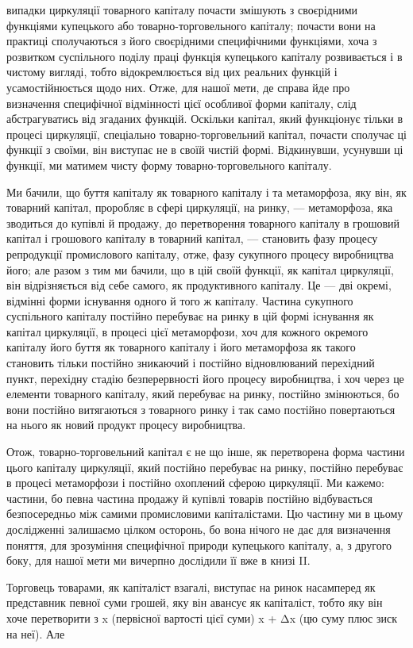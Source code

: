 \parcont{}  %
випадки циркуляції товарного капіталу почасти змішують з своєрідними
функціями купецького або товарно-торговельного капіталу;
почасти вони на практиці сполучаються з його своєрідними
специфічними функціями, хоча з розвитком суспільного
поділу праці функція купецького капіталу розвивається і в чистому
вигляді, тобто відокремлюється від цих реальних функцій
і усамостійнюється щодо них. Отже, для нашої мети, де справа
йде про визначення специфічної відмінності цієї особливої форми
капіталу, слід абстрагуватись від згаданих функцій. Оскільки
капітал, який функціонує тільки в процесі циркуляції, спеціально
товарно-торговельний капітал, почасти сполучає ці функції з своїми,
він виступає не в своїй чистій формі. Відкинувши, усунувши
ці функції, ми матимем чисту форму товарно-торговельного капіталу.

Ми бачили, що буття капіталу як товарного капіталу і та
метаморфоза, яку він, як товарний капітал, проробляє в сфері
циркуляції, на ринку, — метаморфоза, яка зводиться до купівлі
й продажу, до перетворення товарного капіталу в грошовий капітал
і грошового капіталу в товарний капітал, — становить фазу
процесу репродукції промислового капіталу, отже, фазу сукупного
процесу виробництва його; але разом з тим ми бачили, що
в цій своїй функції, як капітал циркуляції, він відрізняється
від себе самого, як продуктивного капіталу. Це — дві окремі,
відмінні форми існування одного й того ж капіталу. Частина
сукупного суспільного капіталу постійно перебуває на ринку
в цій формі існування як капітал циркуляції, в процесі цієї метаморфози,
хоч для кожного окремого капіталу його буття як
товарного капіталу і його метаморфоза як такого становить
тільки постійно зникаючий і постійно відновлюваний перехідний
пункт, перехідну стадію безперервності його процесу виробництва,
і хоч через це елементи товарного капіталу, який перебуває
на ринку, постійно змінюються, бо вони постійно витягаються
з товарного ринку і так само постійно повертаються на нього
як новий продукт процесу виробництва.

Отож, товарно-торговельний капітал є не що інше, як перетворена
форма частини цього капіталу циркуляції, який постійно
перебуває на ринку, постійно перебуває в процесі метаморфози
і постійно охоплений сферою циркуляції. Ми кажемо: частини,
бо певна частина продажу й купівлі товарів постійно відбувається
безпосередньо між самими промисловими капіталістами.
Цю частину ми в цьому дослідженні залишаємо цілком осторонь,
бо вона нічого не дає для визначення поняття, для зрозуміння
специфічної природи купецького капіталу, а, з другого
боку, для нашої мети ми вичерпно дослідили її вже в книзі II.

Торговець товарами, як капіталіст взагалі, виступає на ринок
насамперед як представник певної суми грошей, яку він авансує
як капіталіст, тобто яку він хоче перетворити з x (первісної
вартості цієї суми) x + Δx (цю суму плюс зиск на неї). Але
\parbreak{}  %
